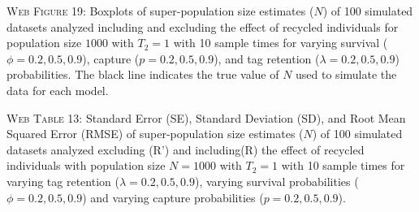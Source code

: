 \documentclass[]{article}
\begin{document}
\textsc{Web Figure 19:} Boxplots of super-population size estimates
(\(N\)) of 100 simulated datasets analyzed including and excluding the effect
of recycled individuals for population size \(1000\) with \(T_2=1\) with
10 sample times for varying survival (\(\phi=0.2,0.5,0.9\)), capture
(\(p=0.2,0.5,0.9\)), and tag retention (\(\lambda=0.2,0.5,0.9\))
probabilities. The black line indicates the true value of \(N\) used to
simulate the data for each model.

\textsc{Web Table 13:} Standard Error (SE), Standard Deviation (SD), and
Root Mean Squared Error (RMSE) of super-population size estimates
(\(N\)) of 100 simulated datasets analyzed excluding (R') and including(R) the
effect of recycled individuals with population size \(N=1000\) with
\(T_2=1\) with 10 sample times for varying tag retention
(\(\lambda=0.2,0.5,0.9\)), varying survival probabilities
(\(\phi=0.2,0.5,0.9\)) and varying capture probabilities
(\(p=0.2,0.5,0.9\)).
\end{document}

